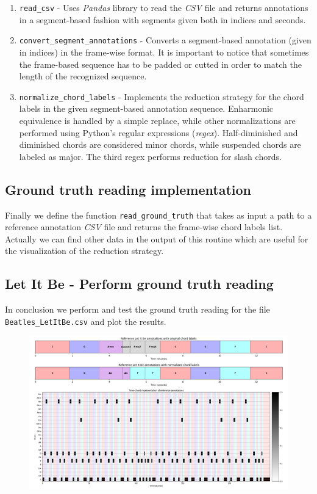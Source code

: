 \documentclass[
	12pt, %
]{fphw}
\begin{document}
\begin{enumerate}
	\item \verb|read_csv| - Uses \emph{Pandas} library to read the \emph{CSV} file and returns annotations in a segment-based fashion with segments given both in indices and seconds.
	\item \verb|convert_segment_annotations| - Converts a segment-based annotation (given in indices) in the frame-wise format. It is important to notice that sometimes the frame-based sequence has to be padded or cutted in order to match the length of the recognized sequence.
	\item \verb|normalize_chord_labels| - Implements the reduction strategy for the chord labels in the given segment-based annotation sequence. Enharmonic equivalence is handled by a simple replace, while other normalizations are performed using Python's regular expressions (\emph{regex}). Half-diminished and diminished chords are considered minor chords, while suspended chords are labeled as major. The third regex performs reduction for slash chords.
\end{enumerate}

\subsection*{Ground truth reading implementation}

Finally we define the function \verb|read_ground_truth| that takes as input a path to a reference annotation \emph{CSV} file and returns the frame-wise chord labels list. Actually we can find other data in the output of this routine which are useful for the visualization of the reduction strategy.

\subsection*{Let It Be - Perform ground truth reading}

In conclusion we perform and test the ground truth reading for the file \verb|Beatles_LetItBe.csv| and plot the results.

\begin{figure}[H]
 \centering
 \includegraphics[scale=1]{./images/2_reference_annotations.png}
\end{figure}
\end{document}
